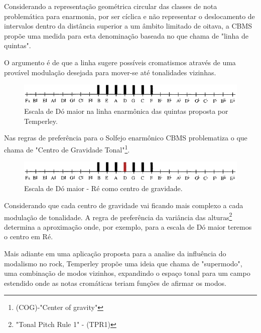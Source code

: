 \documentclass[
	12pt,				%
	openright,			%
	twoside,			%
	a4paper,			%
	english,			%
	french,				%
	spanish,			%
	brazil				%
	]{abntex2}
\begin{document}
Considerando a representação geométrica circular das classes de nota problemática para enarmonia, por ser cíclica e não representar o deslocamento de intervalos dentro da distância superior a um âmbito limitado de oitava, a  CBMS propõe uma medida para esta denominação baseada no que chama de "linha de quintas".

O argumento é de que a linha sugere possíveis cromatismos através de uma provável modulação desejada para mover-se até tonalidades vizinhas.


\begin{figure}[!h]
	\caption{\label{fig_grafico}Escala de Dó maior na linha enarmônica das quintas proposta por Temperley. }
	\begin{center}
	    \includegraphics[scale=0.6]{CBMS/jonico_lineoffifths.png}
	\end{center}
\end{figure}

\pagebreak
Nas regras de preferência para o Solfejo enarmônico  CBMS problematiza o que chama de "Centro de Gravidade Tonal"\footnote{(COG)-"Center of gravity"\cite[ p.125]{temperley2004cognition}}.

\begin{figure}[!h]
	\caption{\label{fig_grafico}Escala de Dó maior - Ré como centro de gravidade. }
	\begin{center}
	    \includegraphics[scale=0.6]{CBMS/COG_re_lineoffifths.png}
	\end{center}
\end{figure}


Considerando que cada centro de gravidade vai ficando mais complexo a cada modulação de tonalidade. A regra de preferência da variância das alturas\footnote{"Tonal Pitch Rule 1" - (TPR1)\cite[ p.125]{temperley2004cognition}} determina a aproximação onde, por exemplo, para a escala de Dó maior teremos o centro em Ré.


Mais adiante em uma aplicação proposta para a analise da influência do modalismo no rock, Temperley propõe uma ideia que chama de "supermodo", uma combinação de modos vizinhos, expandindo o espaço tonal para um campo estendido onde as notas cromáticas teriam funções de afirmar os modos.
\end{document}
